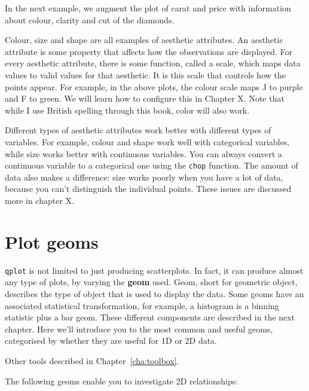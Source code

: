 In the next example, we augment the plot of carat and price with information about colour, clarity and cut of the diamonds.

% 


Colour, size and shape are all examples of aesthetic attributes.  An aesthetic attribute is some property that affects how the observations are displayed.  For every aesthetic attribute, there is some function, called a scale, which maps data values to valid values for that aesthetic.  It is this scale that controls how the points appear.  For example, in the above plots, the colour scale maps J to purple and F to green.  We will learn how to configure this in Chapter X.  Note that while I use British spelling through this book, color will also work.

Different types of aesthetic attributes work better with different types of variables.  For example, colour and shape work well with categorical variables, while size works better with continuous variables.  You can always convert a continuous variable to a categorical one using the {\tt chop} function. The amount of data also makes a difference:  size works poorly when you have a lot of data, because you can't distinguish the individual points.  These issues are discussed more in chapter X.

\section{Plot geoms}\label{sec:plot_geoms}

{\tt qplot} is not limited to just producing scatterplots.  In fact, it can produce almost any type of plots, by varying the {\bf geom} used. Geom, short for geometric object, describes the type of object that is used to display the data.  Some geoms have an associated statistical transformation, for example, a histogram is a binning statistic plus a bar geom.  These different components are described in the next chapter.  Here we'll introduce you to the most common and useful geoms, categorised by whether they are useful for 1D or 2D data.

Other tools described in Chapter~\ref{cha:toolbox}.

The following geoms enable you to investigate 2D relationships:

